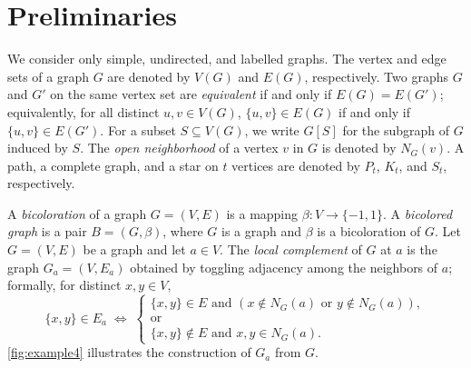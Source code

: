 \documentclass[runningheads,orivec]{llncs}
\begin{document}
\section{Preliminaries}\label{Section_2}
We consider only simple, undirected, and labelled graphs. The vertex and edge sets of a graph $G$ are denoted by $V(G)$ and $E(G)$, respectively. Two graphs $G$ and $G'$ on the same vertex set are \emph{equivalent} if and only if $E(G)=E(G')$; equivalently, for all distinct $u,v\in V(G)$, $\{u,v\}\in E(G)$ if and only if $\{u,v\}\in E(G')$.
For a subset $S\subseteq V(G)$, we write $G[S]$ for the subgraph of $G$ induced by $S$. The \emph{open neighborhood} of a vertex $v$ in $G$ is denoted by $N_G(v)$.
A path, a complete graph, and a star on $t$ vertices are denoted by $P_t$, $K_t$, and $S_t$, respectively.


A \emph{bicoloration} of a graph $G=(V,E)$ is a mapping $\beta:V\to\{-1,1\}$.  
A \emph{bicolored graph} is a pair $B=(G,\beta)$, where $G$ is a graph and $\beta$ is a bicoloration of $G$.
Let $G=(V,E)$ be a graph and let $a\in V$. The \emph{local complement} of $G$ at $a$ is the graph $G_a=(V,E_a)$ obtained by toggling adjacency among the neighbors of $a$; formally, for distinct $x,y\in V$,
\[
\{x,y\}\in E_a \;\Longleftrightarrow\;
\begin{cases}
\{x,y\}\in E \text{ and } (x\notin N_G(a)\text{ or }y\notin N_G(a)),\\[4pt]
\text{or}\\[4pt]
\{x,y\}\notin E \text{ and } x,y\in N_G(a).
\end{cases}
\]
\autoref{fig:example4} illustrates the construction of $G_a$ from $G$.
\end{document}
